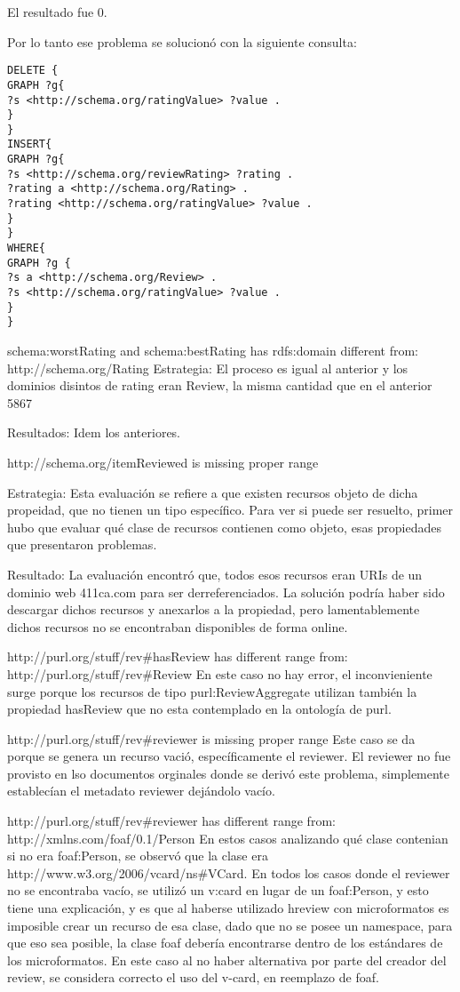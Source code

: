 El resultado fue 0.

Por lo tanto ese problema se solucionó con la siguiente consulta:

\begin{lstlisting}[frame=single]  
DELETE { 
GRAPH ?g{ 
?s <http://schema.org/ratingValue> ?value . 
} 
} 
INSERT{ 
GRAPH ?g{ 
?s <http://schema.org/reviewRating> ?rating . 
?rating a <http://schema.org/Rating> . 
?rating <http://schema.org/ratingValue> ?value . 
}
}
WHERE{
GRAPH ?g {
?s a <http://schema.org/Review> .
?s <http://schema.org/ratingValue> ?value .
}
}
\end{lstlisting}

schema:worstRating and schema:bestRating has rdfs:domain different from: http://schema.org/Rating
Estrategia:
El proceso es igual al anterior y los dominios disintos de rating eran Review, la misma cantidad que en el anterior 5867

Resultados: 
Idem los anteriores.

http://schema.org/itemReviewed is missing proper range

Estrategia:
Esta evaluación se refiere a que existen recursos objeto de dicha propeidad, que no tienen un tipo específico. Para ver si 
puede ser resuelto, primer hubo que evaluar qué clase de recursos contienen como objeto, esas propiedades que presentaron problemas.

Resultado:
La evaluación encontró que, todos esos recursos eran URIs de un dominio web 411ca.com para ser derreferenciados. La solución podría haber sido 
descargar dichos recursos y anexarlos a la propiedad, pero lamentablemente dichos recursos no se encontraban disponibles de forma online.

http://purl.org/stuff/rev\#hasReview has different range from: http://purl.org/stuff/rev\#Review 
En este caso no hay error, el inconvieniente surge porque los recursos de tipo purl:ReviewAggregate utilizan también la propiedad hasReview
que no esta contemplado en la ontología de purl.

http://purl.org/stuff/rev\#reviewer is missing proper range
Este caso se da porque se genera un recurso vació, específicamente el reviewer. El reviewer no fue provisto en lso documentos orginales donde 
se derivó este problema, simplemente establecían el metadato reviewer dejándolo vacío.

http://purl.org/stuff/rev\#reviewer has different range from: http://xmlns.com/foaf/0.1/Person
En estos casos analizando qué clase contenian si no era foaf:Person, se observó que la clase era http://www.w3.org/2006/vcard/ns\#VCard.
En todos los casos donde el reviewer no se encontraba vacío, se utilizó un v:card en lugar de un foaf:Person, y esto tiene una explicación, 
y es que al haberse utilizado hreview con microformatos es imposible crear un recurso de esa clase, dado que no se posee un namespace, para que 
eso sea posible, la clase foaf debería encontrarse dentro de los estándares de los microformatos. 
En este caso al no haber alternativa por parte del creador del review, se considera correcto el uso del v-card, en reemplazo de foaf.

